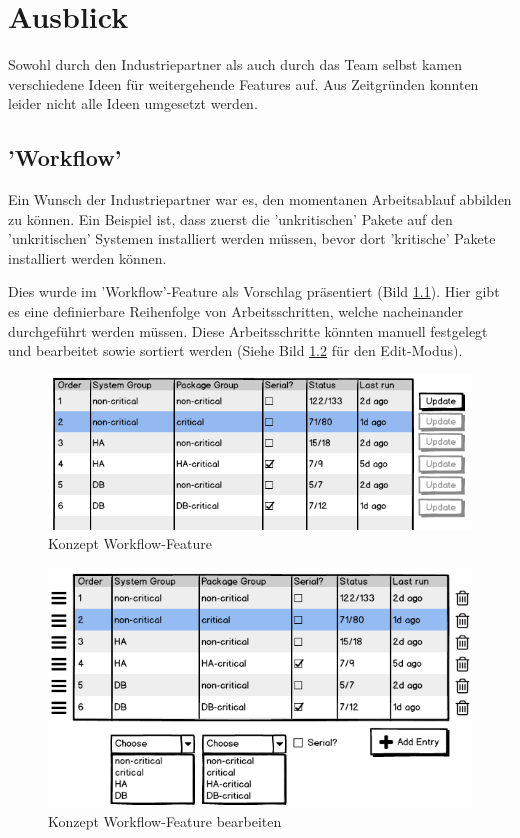 \chapter{Ausblick} \label{sec:ausblick}

Sowohl durch den Industriepartner als auch durch das Team selbst kamen verschiedene Ideen für weitergehende Features auf. Aus Zeitgründen konnten leider nicht alle Ideen umgesetzt werden.

\section{'Workflow'}

Ein Wunsch der Industriepartner war es, den momentanen Arbeitsablauf abbilden zu können. Ein Beispiel ist, dass zuerst die 'unkritischen' Pakete auf den 'unkritischen' Systemen installiert werden müssen, bevor dort 'kritische' Pakete installiert werden können.

Dies wurde im 'Workflow'-Feature als Vorschlag präsentiert (Bild \ref{fig:ausblick:workflow}). Hier gibt es eine definierbare Reihenfolge von Arbeitsschritten, welche nacheinander durchgeführt werden müssen. Diese Arbeitsschritte könnten manuell festgelegt und bearbeitet sowie sortiert werden (Siehe Bild \ref{fig:ausblick:workflow_crud} für den Edit-Modus).

\begin{figure}[H]
	\centering
	\includegraphics[width=0.75\linewidth]{files/mockups/workflow_smaller}
	\caption{Konzept Workflow-Feature}
	\label{fig:ausblick:workflow}
\end{figure}

\begin{figure}[H]
	\centering
	\includegraphics[width=0.75\linewidth]{files/mockups/workflow_CRUD_smaller}
	\caption{Konzept Workflow-Feature bearbeiten}
	\label{fig:ausblick:workflow_crud}
\end{figure}

